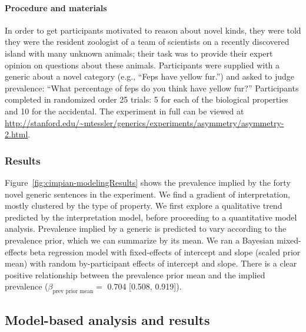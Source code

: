\documentclass[,man,floatsintext]{apa6}
\let\oldparagraph\paragraph
\renewcommand{\paragraph}[1]{\oldparagraph{#1}\mbox{}}
\theoremstyle{definition}
\theoremstyle{definition}
\theoremstyle{definition}
\theoremstyle{remark}
\begin{document}
\hypertarget{procedure-and-materials-1}{%
\paragraph{Procedure and materials}\label{procedure-and-materials-1}}

In order to get participants motivated to reason about novel kinds, they
were told they were the resident zoologist of a team of scientists on a
recently discovered island with many unknown animals; their task was to
provide their expert opinion on questions about these animals.
Participants were supplied with a generic about a novel category (e.g.,
\enquote{Feps have yellow fur.}) and asked to judge prevalence:
\enquote{What percentage of feps do you think have yellow fur?}
Participants completed in randomized order 25 trials: 5 for each of the
biological properties and 10 for the accidental. The experiment in full
can be viewed at
\url{http://stanford.edu/~mtessler/generics/experiments/asymmetry/asymmetry-2.html}.

\hypertarget{results}{%
\subsubsection{Results}\label{results}}

Figure~\ref{fig:cimpian-modelingResults} shows the prevalence implied by
the forty novel generic sentences in the experiment. We find a gradient
of interpretation, mostly clustered by the type of property. We first
explore a qualitative trend predicted by the interpretation model,
before proceeding to a quantitative model analysis. Prevalence implied
by a generic is predicted to vary according to the prevalence prior,
which we can summarize by its mean. We ran a Bayesian mixed-effects beta
regression model with fixed-effects of intercept and slope (scaled prior
mean) with random by-participant effects of intercept and slope. There
is a clear positive relationship between the prevalence prior mean and
the implied prevalence (\(\beta_{\text{prev prior mean}}=\) 0.704
{[}0.508, 0.919{]}).

\hypertarget{model-based-analysis-and-results}{%
\subsection{Model-based analysis and
results}\label{model-based-analysis-and-results}}
\end{document}
